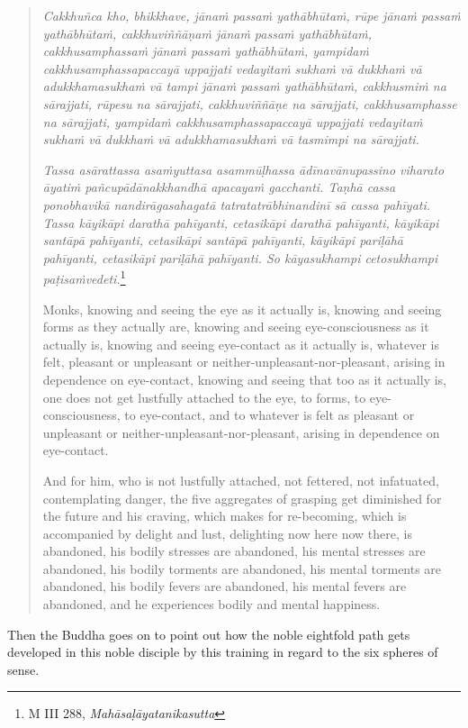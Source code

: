 \begin{quote}
\emph{Cakkhuñca kho, bhikkhave, jānaṁ passaṁ yathābhūtaṁ, rūpe jānaṁ passaṁ yathābhūtaṁ, cakkhuviññāṇaṁ jānaṁ passaṁ yathābhūtaṁ, cakkhusamphassaṁ jānaṁ passaṁ yathābhūtaṁ, yampidaṁ cakkhusamphassapaccayā uppajjati vedayitaṁ sukhaṁ vā dukkhaṁ vā adukkhamasukhaṁ vā tampi jānaṁ passaṁ yathābhūtaṁ, cakkhusmiṁ na sārajjati, rūpesu na sārajjati, cakkhuviññāṇe na sārajjati, cakkhusamphasse na sārajjati, yampidaṁ cakkhusamphassapaccayā uppajjati vedayitaṁ sukhaṁ vā dukkhaṁ vā adukkhamasukhaṁ vā tasmimpi na sārajjati.}

\emph{Tassa asārattassa asaṁyuttasa asammūḷhassa ādīnavānupassino viharato āyatiṁ pañcupādānakkhandhā apacayaṁ gacchanti. Taṇhā cassa ponobhavikā nandirāgasahagatā tatratatrābhinandinī sā cassa pahīyati. Tassa kāyikāpi darathā pahīyanti, cetasikāpi darathā pahīyanti, kāyikāpi santāpā pahīyanti, cetasikāpi santāpā pahīyanti, kāyikāpi pariḷāhā pahīyanti, cetasikāpi pariḷāhā pahīyanti. So kāyasukhampi cetosukhampi paṭisaṁvedeti.}\footnote{M III 288, \emph{Mahāsaḷāyatanikasutta}}

Monks, knowing and seeing the eye as it actually is, knowing and seeing forms as they actually are, knowing and seeing eye-consciousness as it actually is, knowing and seeing eye-contact as it actually is, whatever is felt, pleasant or unpleasant or neither-unpleasant-nor-pleasant, arising in dependence on eye-contact, knowing and seeing that too as it actually is, one does not get lustfully attached to the eye, to forms, to eye-consciousness, to eye-contact, and to whatever is felt as pleasant or unpleasant or neither-unpleasant-nor-pleasant, arising in dependence on eye-contact.

And for him, who is not lustfully attached, not fettered, not infatuated, contemplating danger, the five aggregates of grasping get diminished for the future and his craving, which makes for re-becoming, which is accompanied by delight and lust, delighting now here now there, is abandoned, his bodily stresses are abandoned, his mental stresses are abandoned, his bodily torments are abandoned, his mental torments are abandoned, his bodily fevers are abandoned, his mental fevers are abandoned, and he experiences bodily and mental happiness.
\end{quote}

Then the Buddha goes on to point out how the noble eightfold path gets developed in this noble disciple by this training in regard to the six spheres of sense.

